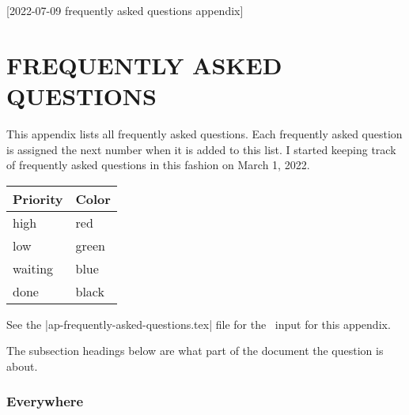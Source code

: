 [2022-07-09 frequently asked questions appendix]

\makeatletter
  \newcommand{\MyAnswer}
    {%
      \vspace*{3pt}
      \noindent
      {\fontsize{9}{10}\reset@font\textbf{ANSWER}}\space\space
    }

  \newcommand{\MyFaq}[2]
    {%
      \vspace*{6pt}
      \noindent
      {%
        \bfseries
        \ifthen{\equal{high}{#2}}{\color{red}}%
        \ifthen{\equal{low}{#2}}{\color{green}}%
        \ifthen{\equal{wait}{#2}}{\color{blue}}%
        \ifthen{\equal{done}{#2}}{\color{black}}%
        {\fontsize{9}{10}\reset@font\bf FAQ}
        #1.
      }%
      \ignorespaces
    }

  \newcommand{\MyFollowup}
    {%
      \vspace*{3pt}
      \noindent
      {\fontsize{9}{10}\reset@font\textbf{FOLLOWUP}}\space\space
    }
\makeatother
  
\chapter{FREQUENTLY ASKED QUESTIONS}

This appendix lists all frequently asked questions.
Each frequently asked question
is assigned the next number
when it is added to this list.
I started keeping track
of frequently asked questions
in this fashion
on March 1, 2022.

\begin{inlinetable}
  \newcommand{\Color}[1]{\color{#1}#1}
  \begin{tabular}{@{}ll@{}}
    \toprule
    \textbf{Priority}& \textbf{Color}\\
    \midrule
    high&    \Color{red}\\
    low&     \Color{green}\\
    waiting& \Color{blue}\\
    done&    \Color{black}\\
    \bottomrule
  \end{tabular}
\end{inlinetable}

See the
|ap-frequently-asked-questions.tex|
file for the \LaTeXLogo\ input for this appendix.

The subsection headings below are what part of the document
the question is about.

\subsection*{Everywhere}

